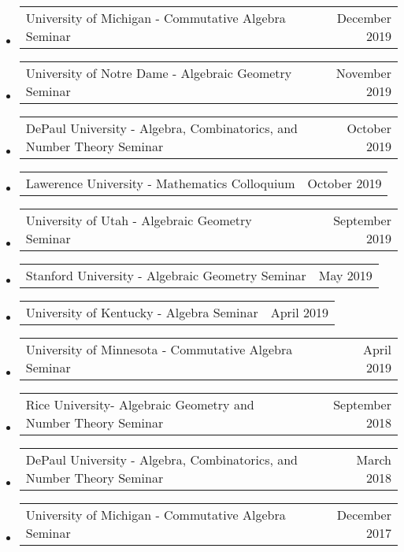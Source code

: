 \documentclass[letterpaper,11pt]{article}
\makeatletter
\newcommand{\ressubheading}[4]{
\begin{tabular*}{6.5in}[t]{l@{\cftdotfill{\cftsecdotsep}\extracolsep{\fill}}r}
		\textbf{#1} & #2 \\
		\textit{#3} & \textit{#4} \\
\end{tabular*}\vspace{-6pt}}
\newcommand{\ressubheadingTalk}[2]{
\begin{tabular*}{6.5in}[t]{l@{\cftdotfill{\cftsecdotsep}\extracolsep{\fill}}r}
		#1 & #2 \\
\end{tabular*}\vspace{-6pt}}
\makeatother
\begin{document}
\begin{itemize}
\item 
	\ressubheadingTalk{University of Michigan - Commutative Algebra Seminar}{December 2019}

\item
	\ressubheadingTalk{University of Notre Dame - Algebraic Geometry Seminar}{November 2019}

\item
	\ressubheadingTalk{DePaul University - Algebra, Combinatorics, and Number Theory Seminar}{October 2019}{}{}
	
\item
	\ressubheadingTalk{Lawerence University - Mathematics Colloquium}{October 2019}{}{}

\item
	\ressubheadingTalk{University of Utah - Algebraic Geometry Seminar}{September 2019}

\item
	\ressubheadingTalk{Stanford University - Algebraic Geometry Seminar}{May 2019}
	
\item
	\ressubheadingTalk{University of Kentucky - Algebra Seminar}{April 2019}
		
\item
	\ressubheadingTalk{University of Minnesota - Commutative Algebra Seminar}{April 2019}
	
	
\item
	\ressubheadingTalk{Rice University- Algebraic Geometry and Number Theory Seminar}{September 2018}{}{}
		
\item
	\ressubheadingTalk{DePaul University - Algebra, Combinatorics, and Number Theory Seminar}{March 2018}{}{}
	

\item
	\ressubheadingTalk{University of Michigan - Commutative Algebra Seminar}{December 2017}{}{}

%
%
\end{itemize}
\end{document}
